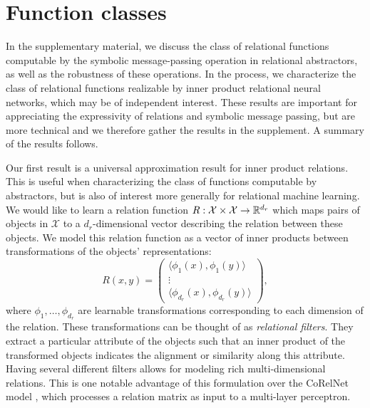 \section{Function classes}
\label{ssec:function_classes}

In the supplementary material, we discuss the class of relational functions computable by the symbolic message-passing operation in relational abstractors, as well as the robustness of these operations. In the process, we characterize the class of relational functions realizable by inner product relational neural networks, which may be of independent interest. These results are important for appreciating the expressivity of relations and symbolic message passing, but are more technical and we therefore gather the results in the supplement. A summary of the results follows.


\def\rdot{\bigcdot}
\def\F{{\mathfrak{F}}}
\def\MLP{\text{MLP}}

Our first result is a universal approximation result for inner product relations. This is useful when characterizing the class of functions computable by abstractors, but is also of interest more generally for relational machine learning.
We would like to learn a relation function \(R: \mathcal{X} \times \mathcal{X} \to \mathbb{R}^{d_r}\) which maps pairs of objects in \(\mathcal{X}\) to a \(d_r\)-dimensional vector describing the relation between these objects. We model this relation function as a vector of inner products between transformations of the objects' representations:
\begin{equation}
	\label{eq:inner_product_relations}
	R(x, y) = \begin{pmatrix}\langle \phi_{1}(x), \phi_{1}(y) \rangle \\ \vdots \\ \langle \phi_{d_r}(x), \phi_{d_r}(y) \rangle \end{pmatrix},
\end{equation}
where \(\phi_{1}, \ldots, \phi_{d_r}\) are learnable transformations corresponding to each dimension of the relation. These transformations can be thought of as \textit{relational filters}. They extract a particular attribute of the objects such that an inner product of the transformed objects indicates the alignment or similarity along this attribute. Having several different filters allows for modeling rich multi-dimensional relations. This is one notable advantage of this formulation over the CoRelNet model \citep{kerg2022neural}, which processes a relation matrix as input to a multi-layer perceptron.


